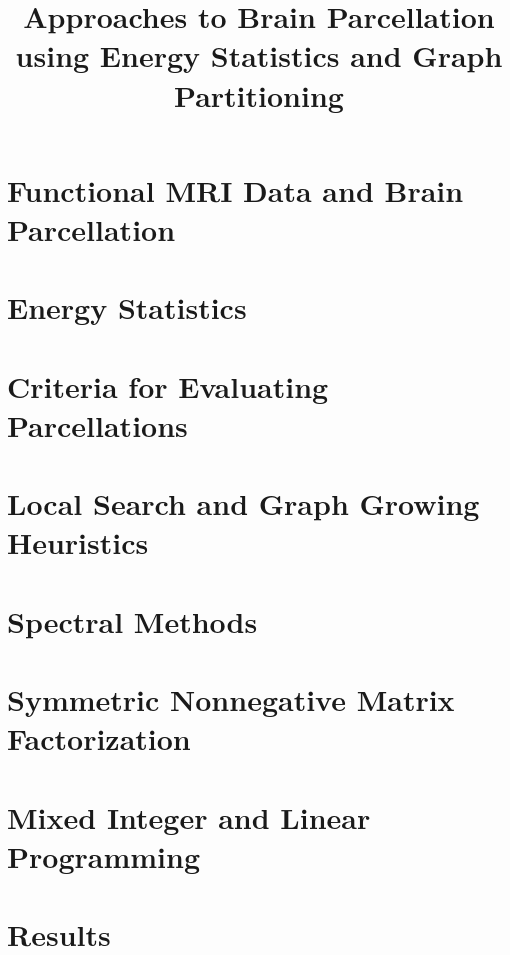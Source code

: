 \documentclass[12pt,lot,lof]{report}
\title{Approaches to Brain Parcellation using Energy Statistics and Graph Partitioning}
\begin{document}
\chapter{Functional MRI Data and Brain Parcellation}


\chapter{Energy Statistics}


\chapter{Criteria for Evaluating Parcellations}


\chapter{Local Search and Graph Growing Heuristics}


\chapter{Spectral Methods}


\chapter{Symmetric Nonnegative Matrix Factorization}


\chapter{Mixed Integer and Linear Programming}


\chapter{Results}




\end{document}
